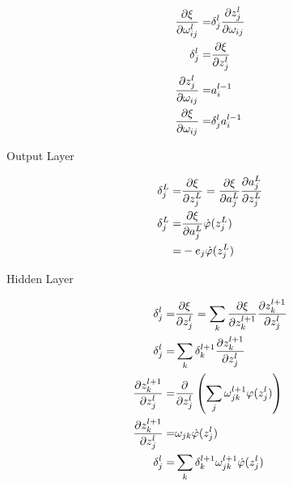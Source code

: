 \documentclass{rbt-mathnotes-formula-sheet}
\begin{document}
\begin{eqnarray}
    \pdv{\xi}{\omega^l_{ij}} = & \delta_j^l \pdv{z_j^l}{\omega_{ij}} \\
    \delta_j^l = & \pdv{\xi}{z_j^l} \\ 
    \pdv{z_j^l}{\omega_{ij}} = & a_i^{l-1} \\ 
    \pdv{\xi}{\omega_{ij}} = & \delta^l_{j} a_i^{l-1} \\ 
\end{eqnarray}

Output Layer 

\begin{eqnarray}
    \delta_j^L =& \pdv{\xi}{z_j^L} = \pdv{\xi}{a_j^L} \pdv{a_j^L}{z_j^L}\\
    \delta_j^L =& \pdv{\xi}{a_j^L} \dot{\varphi}(z_j^L)\\
               =& - e_j \dot{\varphi}(z_j^L)
\end{eqnarray}

Hidden Layer

\begin{eqnarray}
    \delta_j^l = & \pdv{\xi}{z_j^l} = \sum_k \pdv{\xi}{z_k^{l+1}} \pdv{z_k^{l+1}}{z_j^l}\\ 
    \delta_j^l = & \sum_k \delta_k^{l+1} \pdv{z_k^{l+1}}{z_j^l}\\
    \pdv{z_k^{l+1}}{z_j^l} = &
    \frac{\partial}{\partial z_j^l} \left( \sum_j \omega_{jk}^{l+1} \varphi(z_j^l) \right)\\
    \pdv{z_k^{l+1}}{z_j^l} = & \omega_{jk} \dot{\varphi}(z_j^l)\\
    \delta_j^l = & \sum_k \delta_k^{l+1} \omega_{jk}^{l+1} \dot{\varphi}(z_j^l)\\
\end{eqnarray}
\end{document}
